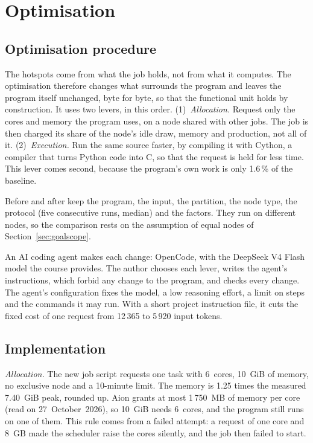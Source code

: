 \documentclass[conference,a4paper]{IEEEtran}
\begin{document}
\section{Optimisation}\label{sec:optimisation}

\subsection{Optimisation procedure}\label{sec:optproc}
The hotspots come from what the job holds, not from what it computes. The
optimisation therefore changes what surrounds the program and leaves the
program itself unchanged, byte for byte, so that the functional unit holds by
construction. It uses two levers, in this order.
(1)~\emph{Allocation.} Request only the cores and memory the program uses, on a
node shared with other jobs. The job is then charged its share of the node's
idle draw, memory and production, not all of it.
(2)~\emph{Execution.} Run the same source faster, by compiling it with Cython,
a compiler that turns Python code into C, so that the request is held for less
time. This lever comes second, because the program's own work is only 1.6\,\% of
the baseline.

Before and after keep the program, the input, the partition, the node type,
the protocol (five consecutive runs, median) and the factors. They run on
different nodes, so the comparison rests on the assumption of equal nodes of
Section~\ref{sec:goalscope}.

An AI coding agent makes each change: OpenCode, with the DeepSeek V4 Flash model
the course provides. The author chooses each lever, writes the agent's
instructions, which forbid any change to the program, and checks every change.
The agent's configuration fixes the model, a low reasoning effort, a limit on
steps and the commands it may run. With a short project instruction file, it
cuts the fixed cost of one request from 12\,365 to 5\,920 input tokens.

\subsection{Implementation}\label{sec:implementation}
\emph{Allocation.} The new job script requests one task with 6~cores, 10~GiB of
memory, no exclusive node and a 10-minute limit. The memory is 1.25 times the
measured 7.40~GiB peak, rounded up. Aion grants at most 1\,750~MB of memory per
core (read on 27~October~2026), so 10~GiB needs 6~cores, and the program still
runs on one of them. This rule comes from a failed attempt: a request of one
core and 8~GB made the scheduler raise the cores silently, and the job then
failed to start.
\end{document}
